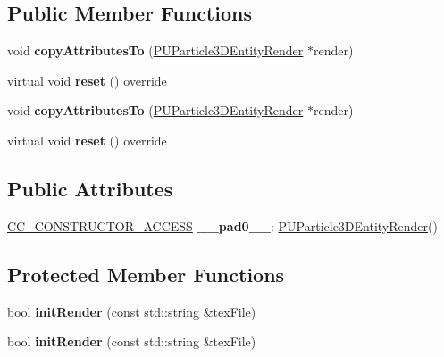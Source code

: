\subsection*{Public Member Functions}
\begin{DoxyCompactItemize}
\item 
\mbox{\label{classPUParticle3DEntityRender_ad5e2b1f0c25fdcfaa7ad7722e7111e9d}} 
void {\bfseries copy\+Attributes\+To} (\hyperlink{classPUParticle3DEntityRender}{P\+U\+Particle3\+D\+Entity\+Render} $\ast$render)
\item 
\mbox{\label{classPUParticle3DEntityRender_af8d936c6d605879091ad2e9e10c5d764}} 
virtual void {\bfseries reset} () override
\item 
\mbox{\label{classPUParticle3DEntityRender_ad5e2b1f0c25fdcfaa7ad7722e7111e9d}} 
void {\bfseries copy\+Attributes\+To} (\hyperlink{classPUParticle3DEntityRender}{P\+U\+Particle3\+D\+Entity\+Render} $\ast$render)
\item 
\mbox{\label{classPUParticle3DEntityRender_ad625931d95340beba493473f0799dca9}} 
virtual void {\bfseries reset} () override
\end{DoxyCompactItemize}
\subsection*{Public Attributes}
\begin{DoxyCompactItemize}
\item 
\mbox{\label{classPUParticle3DEntityRender_a4b4fa16cd7df0728db99817dcdde6285}} 
\hyperlink{_2cocos2d_2cocos_2base_2ccConfig_8h_a25ef1314f97c35a2ed3d029b0ead6da0}{C\+C\+\_\+\+C\+O\+N\+S\+T\+R\+U\+C\+T\+O\+R\+\_\+\+A\+C\+C\+E\+SS} {\bfseries \+\_\+\+\_\+pad0\+\_\+\+\_\+}\+: \hyperlink{classPUParticle3DEntityRender}{P\+U\+Particle3\+D\+Entity\+Render}()
\end{DoxyCompactItemize}
\subsection*{Protected Member Functions}
\begin{DoxyCompactItemize}
\item 
\mbox{\label{classPUParticle3DEntityRender_a9937ebdb6a2552c2710b795933576895}} 
bool {\bfseries init\+Render} (const std\+::string \&tex\+File)
\item 
\mbox{\label{classPUParticle3DEntityRender_a9937ebdb6a2552c2710b795933576895}} 
bool {\bfseries init\+Render} (const std\+::string \&tex\+File)
\end{DoxyCompactItemize}
